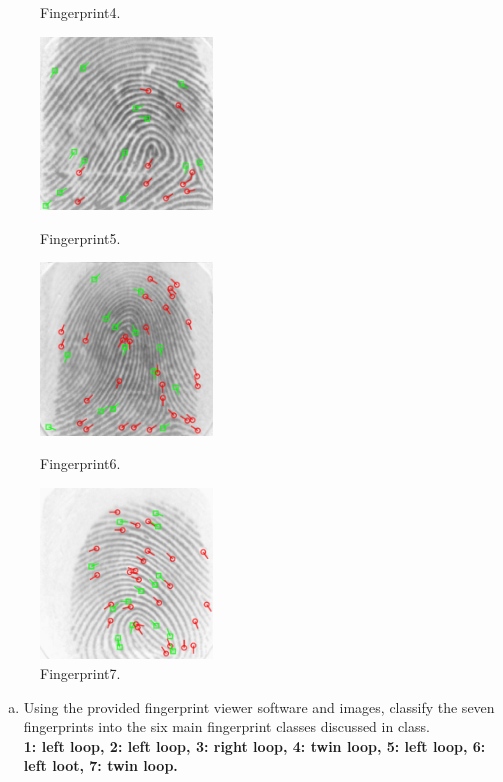 \documentclass[a4paper]{article}
\begin{document}
\begin{spacing}{2.0}
\begin{figure}[h]
\begin{minipage}[t]{0.24\linewidth}
	\caption{Fingerprint4.}
	\label{ROC}
	\end{minipage}
	\end{figure}
\begin{figure}[h]	
	\begin{minipage}[t]{0.3\linewidth}
	\centering
	\includegraphics[width = 1.8in]{5.png}
	\caption{Fingerprint5.}
	\label{scoreDis}
	\end{minipage}
	\begin{minipage}[t]{0.3\linewidth}
	\centering
	\includegraphics[width = 1.8in]{6.png}
	\caption{Fingerprint6.}
	\label{CMC}
	\end{minipage}
	\begin{minipage}[t]{0.3\linewidth}
	\centering
	\includegraphics[width = 1.8in]{7.png}
	\caption{Fingerprint7.}
	\end{minipage}
	\end{figure}
	
	\begin{enumerate}[(a)]

	
	\item Using the provided fingerprint viewer software and images, classify the seven fingerprints into the 	six main fingerprint classes discussed in class.\\
	\textbf{1: left loop, 2: left loop, 3: right loop,  4: twin loop, 5: left loop, 6: left loot, 7: twin loop.}
	

\end{enumerate}
\end{spacing}
\end{document}
